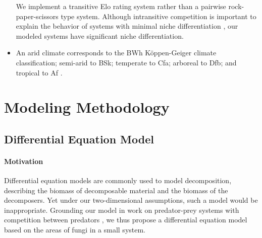 \documentclass[12pt]{article}
\begin{document}
\begin{itemize}
    We implement a transitive Elo rating system rather than a pairwise rock-paper-scissors type system. Although intransitive competition is important to explain the behavior of systems with minimal niche differentiation \cite{diversity_begets_diversity}, our modeled systems have significant niche differentiation.
    \item An arid climate corresponds to the BWh Köppen-Geiger climate classification; semi-arid to BSk; temperate to Cfa; arboreal to Dfb; and tropical to Af \cite{koppen}.
\end{itemize}

\section{Modeling Methodology}




\subsection{Differential Equation Model}

\paragraph{Motivation}
Differential equation models are commonly used to model decomposition, describing the biomass of decomposable material and the biomass of the decomposers. Yet under our two-dimensional assumptions, such a model would be inappropriate. Grounding our model in work on predator-prey systems with competition between predators \cite{predator-prey}, we thus propose a differential equation model based on the areas of fungi in a small system. 
\end{document}
